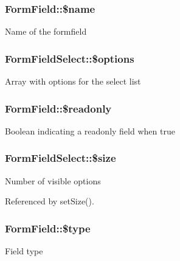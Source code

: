 \subsubsection[{\$name}]{\setlength{\rightskip}{0pt plus 5cm}FormField::\$name}\label{classFormField_a23861f707bcd77bbace6300de9621746}
Name of the formfield 
\subsubsection[{\$options}]{\setlength{\rightskip}{0pt plus 5cm}FormFieldSelect::\$options}\label{classFormFieldSelect_a5c4b74ae8d7274e642e78e5a514c9736}
Array with options for the select list 
\subsubsection[{\$readonly}]{\setlength{\rightskip}{0pt plus 5cm}FormField::\$readonly}\label{classFormField_a78ba5d4b9127e75e8ccf86f397b5d9ac}
Boolean indicating a readonly field when true 
\subsubsection[{\$size}]{\setlength{\rightskip}{0pt plus 5cm}FormFieldSelect::\$size}\label{classFormFieldSelect_a8e79d63b2f69dc06959f3f0dc6f0a12a}
Number of visible options 

Referenced by setSize().

\subsubsection[{\$type}]{\setlength{\rightskip}{0pt plus 5cm}FormField::\$type}\label{classFormField_a37bed21a1891e95be0e4a697e45ba51b}
Field type 

